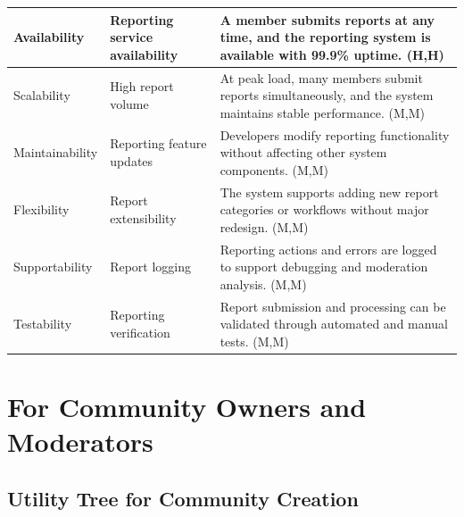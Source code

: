 \documentclass{article}
\begin{document}
\begin{table}[H]
\begin{tabular}{|p{3cm}|p{4cm}|p{7cm}|}
        Availability
                                   & Reporting service availability
                                   & A member submits reports at any time, and the reporting system is available with 99.9\% uptime. (H,H)                                    \\
        \hline

        Scalability
                                   & High report volume
                                   & At peak load, many members submit reports simultaneously, and the system maintains stable performance. (M,M)                             \\
        \hline

        Maintainability
                                   & Reporting feature updates
                                   & Developers modify reporting functionality without affecting other system components. (M,M)                                               \\
        \hline

        Flexibility
                                   & Report extensibility
                                   & The system supports adding new report categories or workflows without major redesign. (M,M)                                              \\
        \hline

        Supportability
                                   & Report logging
                                   & Reporting actions and errors are logged to support debugging and moderation analysis. (M,M)                                              \\
        \hline

        Testability
                                   & Reporting verification
                                   & Report submission and processing can be validated through automated and manual tests. (M,M)                                              \\
        \hline
    \end{tabular}
\end{table}

\section{For Community Owners and Moderators}

\subsection{Utility Tree for Community Creation}
\end{document}
